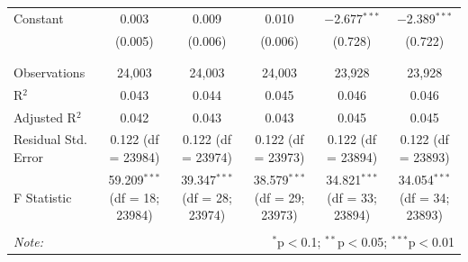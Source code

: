 \documentclass[a4paper,12pt]{article}
\begin{document}
\begin{table}[!htbp]
{\begin{tabular}{@{\extracolsep{5pt}}lccccc}
 Constant & 0.003 & 0.009 & 0.010 & $-$2.677$^{***}$ & $-$2.389$^{***}$ \\ 
  & (0.005) & (0.006) & (0.006) & (0.728) & (0.722) \\ 
  & & & & & \\ 
\hline \\[-1.8ex] 
Observations & 24,003 & 24,003 & 24,003 & 23,928 & 23,928 \\ 
R$^{2}$ & 0.043 & 0.044 & 0.045 & 0.046 & 0.046 \\ 
Adjusted R$^{2}$ & 0.042 & 0.043 & 0.043 & 0.045 & 0.045 \\ 
Residual Std. Error & 0.122 (df = 23984) & 0.122 (df = 23974) & 0.122 (df = 23973) & 0.122 (df = 23894) & 0.122 (df = 23893) \\ 
F Statistic & 59.209$^{***}$ (df = 18; 23984) & 39.347$^{***}$ (df = 28; 23974) & 38.579$^{***}$ (df = 29; 23973) & 34.821$^{***}$ (df = 33; 23894) & 34.054$^{***}$ (df = 34; 23893) \\ 
\endrule
\hline 
\hline \\[-1.8ex] 
\textit{Note:}  & \multicolumn{5}{r}{$^{*}$p$<$0.1; $^{**}$p$<$0.05; $^{***}$p$<$0.01} \\ 
\end{tabular} }
\end{table} 
\end{document}

